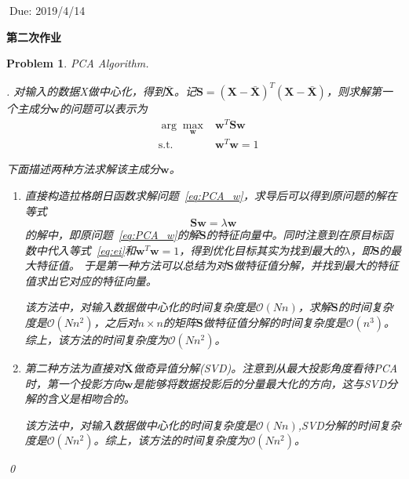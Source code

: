 \documentclass[UTF8]{article}
\newtheorem{hw}{Problem}
\newenvironment{sol}
  {\par\vspace{3mm}\noindent{\it Solution}.}
  {\qed}
\DeclareMathOperator{\mst}{s.t.}
\newcommand{\argmax}{\arg\!\max}
\newcommand{\Smat}[0]{{{\boldsymbol S}}}
\newcommand{\Xmat}{{\boldsymbol X}}
\newcommand{\wv}{\boldsymbol{w}}
\begin{document}
$\;$\hfill Due: 2019/4/14

\begin{center}
{\LARGE\bf 第二次作业}
\end{center}


\begin{hw}
PCA Algorithm.

\begin{sol}
	对输入的数据X做中心化，得到$\bar{\Xmat}$。记$\Smat=(\Xmat-\bar{\Xmat})^T(\Xmat-\bar{\Xmat})$，则求解第一个主成分$\wv$的问题可以表示为
	\begin{equation}
	\label{eq:PCA_w}
	\begin{aligned}
		&\argmax_{\wv} &\wv^T\Smat\wv\\
		&\mst &\wv^T\wv=1
	\end{aligned}
	\end{equation}
	
	下面描述两种方法求解该主成分$\wv$。
	\begin{enumerate}
		\item[(1)]{
			直接构造拉格朗日函数求解问题~\eqref{eq:PCA_w}，求导后可以得到原问题的解在等式
			\begin{equation}
				\label{eq:ei}
				\Smat\wv = \lambda \wv
			\end{equation}
			的解中，即原问题~\eqref{eq:PCA_w}的解$\Smat$的特征向量中。同时注意到在原目标函数中代入等式~\eqref{eq:ei}和$\wv^T\wv=1$，得到优化目标其实为找到最大的$\lambda$，即$\Smat$的最大特征值。
			于是第一种方法可以总结为对$\Smat$做特征值分解，并找到最大的特征值求出它对应的特征向量。
			
			该方法中，对输入数据做中心化的时间复杂度是$\mathcal{O}(Nn)$，求解$\Smat$的时间复杂度是$\mathcal{O}(Nn^2)$，之后对$n\times n$的矩阵$\Smat$做特征值分解的时间复杂度是$\mathcal{O}(n^3)$。综上，该方法的时间复杂度为$\mathcal{O}(Nn^2)$。
		}
		\item[(2)]{
			第二种方法为直接对$\bar{\Xmat}$做奇异值分解(SVD)。注意到从最大投影角度看待PCA时，第一个投影方向$\wv$是能够将数据投影后的分量最大化的方向，这与SVD分解的含义是相吻合的。
			
			该方法中，对输入数据做中心化的时间复杂度是$\mathcal{O}(Nn)$,SVD分解的时间复杂度是$\mathcal{O}(Nn^2)$。综上，该方法的时间复杂度为$\mathcal{O}(Nn^2)$。
		}
	\end{enumerate}
\end{sol}
\end{hw}
\end{document}
